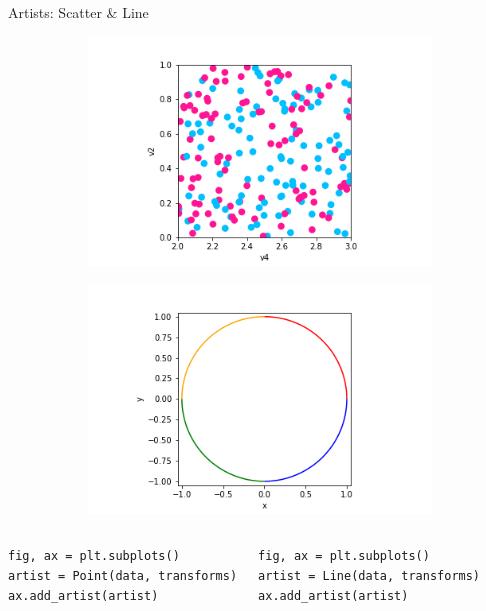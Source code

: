 \documentclass[xcolor={dvipsnames}, handout]{beamer}
\begin{document}
\begin{frame}[fragile]{Artists: Scatter \& Line}
\begin{figure}[H]
    \begin{subfigure}{0.49\textwidth}
        \includegraphics[width=\textwidth]{figures/code/scatter_0.png}
    \end{subfigure}
    \begin{subfigure}{0.49\textwidth}
        \includegraphics[width=\textwidth]{figures/code/line_1.png}
    \end{subfigure}
\end{figure}
\begin{columns}
\begin{verbatim}
fig, ax = plt.subplots()
artist = Point(data, transforms)
ax.add_artist(artist)
\end{verbatim}
\begin{verbatim}
fig, ax = plt.subplots()
artist = Line(data, transforms)
ax.add_artist(artist)
\end{verbatim}
\end{columns}
\end{frame}
\end{document}
